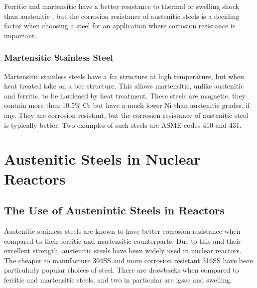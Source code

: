 Ferritic and martensitic have a better resistance to thermal or swelling shock than austenitic \cite{bccfenimodel}, but the corrosion resistance of austenitic steels is a deciding factor when choosing a steel for an application where corrosion resistance is important.



\subsubsection{Martensitic Stainless Steel}

Martensitic stainless steels have a \acrshort{fcc} structure at high temperature, but when heat treated take on a \acrshort{bcc}  structure.  This allows martensitic, unlike austenitic and ferritic, to be hardened by heat treatment.  These steels are magnetic, they contain more than 10.5\% Cr but have a much lower Ni than austenitic grades, if any.  They are corrosion resistant, but the corrosion resistance of austenitic steel is typically better.  Two examples of such steels are ASME codes 410 and 431. 







\section[Use In Reactors]{Austenitic Steels in Nuclear Reactors}

\subsection{The Use of Austenintic Steels in Reactors}

Austenitic stainless steels are known to have better corrosion resistance when compared to their ferritic and martensitic counterparts.  Due to this and their excellent strength, austenitic steels have been widely used in nuclear reactors.  The cheaper to manufacture \gls{304SS} and more corrosion resistant \gls{316SS} have been particularly popular choices of steel.  There are drawbacks when compared to ferritic and martensitic steels, and two in particular are \acrshort{igscc} and swelling.




